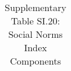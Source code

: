 \begin{longtable}{llcccccccccc}
\caption{Supplementary Table SI.20: Social Norms Index Components} \label{tab:pap__c2_5} \\                                                                                                                                                                                                                                                                                                                                                                                                                                                                                                                                                                                                                                                                                                                                                                                               
\hline \hline                                                                                                                                                                                                                                                                                                                                                                                                                                                                                                                                                                                                                                                                                                                                                                                                                                                                             

\end{longtable}

